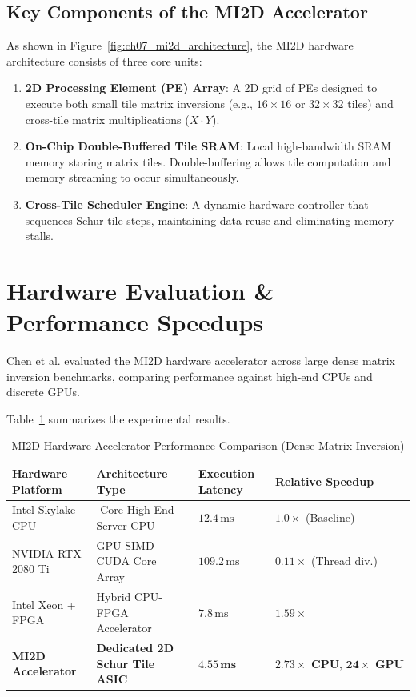 \subsection{Key Components of the MI2D Accelerator}
As shown in Figure~\ref{fig:ch07_mi2d_architecture}, the MI2D hardware architecture consists of three core units:
\begin{enumerate}[leftmargin=*]
    \item \textbf{2D Processing Element (PE) Array}: A 2D grid of PEs designed to execute both small tile matrix inversions (e.g., $16 \times 16$ or $32 \times 32$ tiles) and cross-tile matrix multiplications ($X \cdot Y$).
    \item \textbf{On-Chip Double-Buffered Tile SRAM}: Local high-bandwidth SRAM memory storing matrix tiles. Double-buffering allows tile computation and memory streaming to occur simultaneously.
    \item \textbf{Cross-Tile Scheduler Engine}: A dynamic hardware controller that sequences Schur tile steps, maintaining data reuse and eliminating memory stalls.
\end{enumerate}

\section{Hardware Evaluation \& Performance Speedups}
Chen et al. evaluated the MI2D hardware accelerator across large dense matrix inversion benchmarks, comparing performance against high-end CPUs and discrete GPUs.

Table~\ref{tab:ch07_mi2d_perf} summarizes the experimental results.

\begin{table}[htbp]
\centering
\small
\caption{MI2D Hardware Accelerator Performance Comparison (Dense Matrix Inversion)}
\label{tab:ch07_mi2d_perf}
\begin{tabularx}{\textwidth}{>{\raggedright\arraybackslash}p{3.0cm} >{\raggedright\arraybackslash}X >{\raggedright\arraybackslash}p{2.2cm} >{\raggedright\arraybackslash}p{2.8cm}}
\toprule
\textbf{Hardware Platform} & \textbf{Architecture Type} & \textbf{Execution Latency} & \textbf{Relative Speedup} \\
\midrule
Intel Skylake CPU & 28-Core High-End Server CPU & $12.4\,\text{ms}$ & $1.0\times$ (Baseline) \\
NVIDIA RTX 2080 Ti & GPU SIMD CUDA Core Array & $109.2\,\text{ms}$ & $0.11\times$ (Thread div.) \\
Intel Xeon + FPGA & Hybrid CPU-FPGA Accelerator & $7.8\,\text{ms}$ & $1.59\times$ \\
\textbf{MI2D Accelerator} & \textbf{Dedicated 2D Schur Tile ASIC} & $\mathbf{4.55\,\text{ms}}$ & $\mathbf{2.73\times\text{ CPU, } 24\times\text{ GPU}}$ \\
\bottomrule
\end{tabularx}
\end{table}

